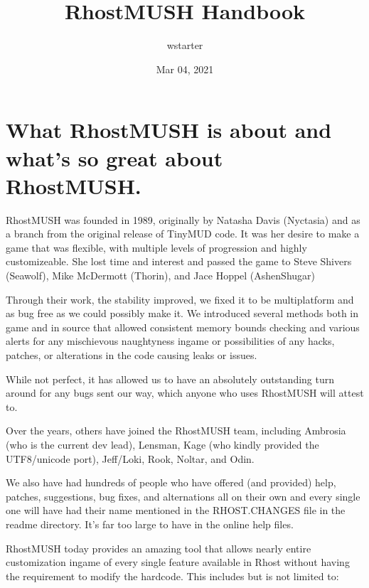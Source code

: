 \documentclass[letterpaper,10pt,english]{sphinxmanual}
\title{RhostMUSH Handbook}
\date{Mar 04, 2021}
\author{wstarter}
\begin{document}
\pagestyle{empty}
\sphinxmaketitle
\pagestyle{plain}
\sphinxtableofcontents
\pagestyle{normal}
\label{\detokenize{index::doc}}



\chapter{What RhostMUSH is about and what’s so great about RhostMUSH.}
\label{\detokenize{01-intro:what-rhostmush-is-about-and-what-s-so-great-about-rhostmush}}\label{\detokenize{01-intro::doc}}
\sphinxAtStartPar
RhostMUSH was founded in 1989, originally by Natasha Davis (Nyctasia) and as
a branch from the original release of TinyMUD code.  It was her desire to make
a game that was flexible, with multiple levels of progression and highly
customizeable.  She lost time and interest and passed the game to
Steve Shivers (Seawolf), Mike McDermott (Thorin), and Jace Hoppel (Ashen\sphinxhyphen{}Shugar)

\sphinxAtStartPar
Through their work, the stability improved, we fixed it to be multi\sphinxhyphen{}platform
and as bug free as we could possibly make it.  We introduced several methods both
in game and in source that allowed consistent memory bounds checking and
various alerts for any mischievous naughtyness in\sphinxhyphen{}game or possibilities of any
hacks, patches, or alterations in the code causing leaks or issues.

\sphinxAtStartPar
While not perfect, it has allowed us to have an absolutely outstanding
turn around for any bugs sent our way, which anyone who uses RhostMUSH will
attest to.

\sphinxAtStartPar
Over the years, others have joined the RhostMUSH team, including Ambrosia
(who is the current dev lead), Lensman, Kage (who kindly provided the
UTF8/unicode port), Jeff/Loki, Rook, Noltar, and Odin.

\sphinxAtStartPar
We also have had hundreds of people who have offered (and provided) help,
patches, suggestions, bug fixes, and alternations all on their own and
every single one will have had their name mentioned in the RHOST.CHANGES
file in the readme directory.  It’s far too large to have in the online
help files.

\sphinxAtStartPar
RhostMUSH today provides an amazing tool that allows nearly entire
customization in\sphinxhyphen{}game of every single feature available in Rhost without
having the requirement to modify the hardcode.  This includes but is
not limited to:
\end{document}
